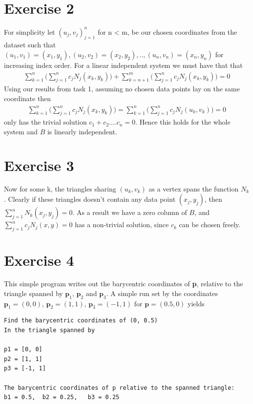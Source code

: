 \documentclass[a4paper,norsk]{article}
\begin{document}
\newpage
\section*{Exercise 2}
For simplicity let  ${(u_j, v_j)}_{j=1}^n$ for n < m, be our chosen coordinates from the dataset such that $(u_1, v_1) = (x_1, y_1), (u_2, v_2) = (x_2, y_2),.., (u_n, v_n) = (x_n, y_n)$ for increasing index order. For a linear independent system we must have that that 
\begin{align}
\sum_{k=1}^n \Big(\sum_{j=1}^n c_j N_j(x_k,y_k) \Big) + \sum_{k=n+1}^m \Big(\sum_{j=1}^n c_j N_j(x_k,y_k) \Big) = 0
\end{align}
Using our results from task 1, assuming no chosen data points lay on the same coordinate then
\begin{align*} 
\sum_{k=1}^n \Big(\sum_{j=1}^n c_j N_j(x_k,y_k) \Big)= \sum_{k=1}^n \Big(\sum_{j=1}^n c_j N_j(u_k,v_k) \Big) = 0
\end{align*}
only has the trivial solution $c_1 + c_2 .... c_n  = 0$. Hence this holds for the whole system and $B$ is linearly independent.

\section*{Exercise 3}
Now for some k, the triangles sharing $(u_k, v_k)$ as a vertex spans the function $N_k$. Clearly if these triangles doesn't contain any data point $(x_j, y_j)$, then
$\sum_{j=1}^n N_k(x_j,y_j) = 0$. As a result we have a zero column of $B$, and $\sum_{j=1}^n c_j N_j(x,y) = 0 $ has a non-trivial solution, since $c_k$ can be chosen freely.


\newpage
\section*{Exercise 4}
This simple program writes out the barycentric coordinates of \textbf{p}, relative to the triangle spanned by $\textbf{p}_1$, $\textbf{p}_2$ and $\textbf{p}_3$. 
A simple run set by the coordinates $\textbf{p}_1 = (0, 0)$, $\textbf{p}_2 = (1, 1)$, $\textbf{p}_3 = (-1, 1)$ for $\textbf{p} = (0.5, 0)$ yields

\begin{lstlisting}[style=terminal]
Find the barycentric coordinates of (0, 0.5) 
In the triangle spanned by 

p1 = [0, 0]
p2 = [1, 1]
p3 = [-1, 1]

The barycentric coordinates of p relative to the spanned triangle:
b1 = 0.5,  b2 = 0.25,   b3 = 0.25
\end{lstlisting}
\end{document}
